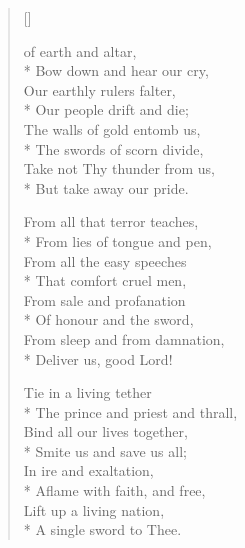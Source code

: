 \newHymn


\begin{verse}[\versewidth]
\begin{altverse}
 of earth and altar,\\*
Bow down and hear our cry,\\
Our earthly rulers falter,\\*
Our people drift and die;\\
The walls of gold entomb us,\\*
The swords of scorn divide,\\
Take not Thy thunder from us,\\*
But take away our pride.
\end{altverse}

\begin{altverse}
From all that terror teaches,\\*
From lies of tongue and pen,\\
From all the easy speeches\\*
That comfort cruel men,\\
From sale and profanation\\*
Of honour and the sword,\\
From sleep and from damnation,\\*
Deliver us, good Lord!
\end{altverse}

\begin{altverse}
Tie in a living tether\\*
The prince and priest and thrall,\\
Bind all our lives together,\\*
Smite us and save us all;\\
In ire and exaltation,\\*
Aflame with faith, and free,\\
Lift up a living nation,\\*
A single sword to Thee.
\end{altverse}

\end{verse}

